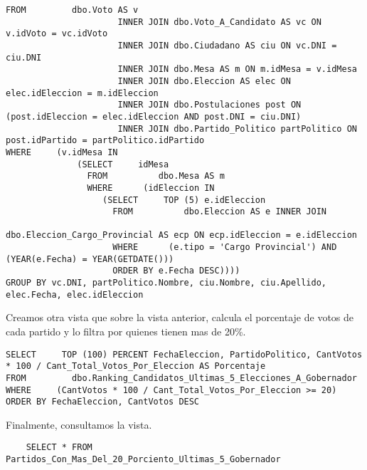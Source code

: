 \begin{enumerate}
\begin{lstlisting}
FROM         dbo.Voto AS v 
                      INNER JOIN dbo.Voto_A_Candidato AS vc ON v.idVoto = vc.idVoto 
                      INNER JOIN dbo.Ciudadano AS ciu ON vc.DNI = ciu.DNI 
                      INNER JOIN dbo.Mesa AS m ON m.idMesa = v.idMesa 
                      INNER JOIN dbo.Eleccion AS elec ON elec.idEleccion = m.idEleccion
                      INNER JOIN dbo.Postulaciones post ON (post.idEleccion = elec.idEleccion AND post.DNI = ciu.DNI)
                      INNER JOIN dbo.Partido_Politico partPolitico ON post.idPartido = partPolitico.idPartido
WHERE     (v.idMesa IN
              (SELECT     idMesa
                FROM          dbo.Mesa AS m
                WHERE      (idEleccion IN
		           (SELECT     TOP (5) e.idEleccion
		             FROM          dbo.Eleccion AS e INNER JOIN
		                                    dbo.Eleccion_Cargo_Provincial AS ecp ON ecp.idEleccion = e.idEleccion
		             WHERE      (e.tipo = 'Cargo Provincial') AND (YEAR(e.Fecha) = YEAR(GETDATE()))
		             ORDER BY e.Fecha DESC))))
GROUP BY vc.DNI, partPolitico.Nombre, ciu.Nombre, ciu.Apellido, elec.Fecha, elec.idEleccion
\end{lstlisting}

Creamos otra vista que sobre la vista anterior, calcula el porcentaje de votos de cada partido y lo filtra por quienes tienen mas de 20\%.

\begin{lstlisting}
SELECT     TOP (100) PERCENT FechaEleccion, PartidoPolitico, CantVotos * 100 / Cant_Total_Votos_Por_Eleccion AS Porcentaje
FROM         dbo.Ranking_Candidatos_Ultimas_5_Elecciones_A_Gobernador
WHERE     (CantVotos * 100 / Cant_Total_Votos_Por_Eleccion >= 20)
ORDER BY FechaEleccion, CantVotos DESC
\end{lstlisting}

Finalmente, consultamos la vista.

\begin{lstlisting}
	SELECT * FROM Partidos_Con_Mas_Del_20_Porciento_Ultimas_5_Gobernador
\end{lstlisting}

\end{enumerate}